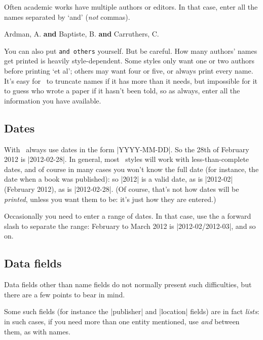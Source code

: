 {Often academic works have multiple authors or editors. In that case,
enter all the names separated by `and' (\emph{not} commas).
\begin{center}
\ttfamily
Ardman, A. \textbf{and} Baptiste, B. \textbf{and} Carruthers, C.
\end{center}

You can also put \verb|and others| yourself. But be careful. How many
authors' names get printed is heavily style-dependent. Some styles only want one or two authors before
printing `et al'; others may want four or five, or always print every
name. It's easy for \biblatex\ to truncate names if it has more than
it needs, but impossible for it to guess who wrote a paper if it
hasn't been told, so as always, enter all the information you have
available.

\subsection{Dates}

With \biblatex\ always use dates in the form |YYYY-MM-DD|. So the 28th
of February 2012 is |2012-02-28|. In general, most \biblatex\ styles
will work with less-than-complete dates, and of course in many cases
you won't know the full date (for instance, the date when a book was
published): so |2012| is a valid date, as is |2012-02| (February
2012), as is |2012-02-28|. (Of course, that's not how dates will be
\emph{printed}, unless you want them to be: it's just how they are
entered.)

Occasionally you need to enter a range of dates. In that case, use the
a forward slash to separate the range: February to March 2012 is
|2012-02/2012-03|, and so on.

\subsection{Data fields}

Data fields other than name fields do not normally present such
difficulties, but there are a few points to bear in mind.

Some such fields (for instance the |publisher| and |location| fields)
are in fact \emph{lists}: in such cases, if you need more than one
entity mentioned, use \emph{and} between them, as with names.

}
